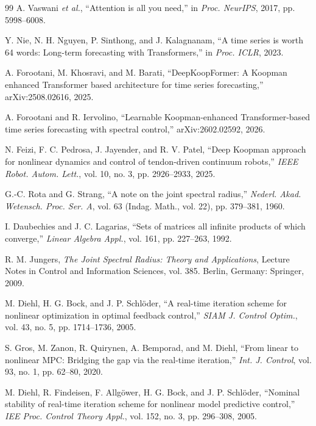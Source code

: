 \documentclass[journal]{IEEEtran}
\begin{document}
\begin{thebibliography}{99}
A. Vaswani \emph{et al.}, ``Attention is all you need,'' in \emph{Proc. NeurIPS}, 2017, pp. 5998--6008.

Y. Nie, N. H. Nguyen, P. Sinthong, and J. Kalagnanam, ``A time series is worth 64 words: Long-term forecasting with Transformers,'' in \emph{Proc. ICLR}, 2023.

A. Forootani, M. Khosravi, and M. Barati, ``DeepKoopFormer: A Koopman enhanced Transformer based architecture for time series forecasting,'' arXiv:2508.02616, 2025.

A. Forootani and R. Iervolino, ``Learnable Koopman-enhanced Transformer-based time series forecasting with spectral control,'' arXiv:2602.02592, 2026.

N. Feizi, F. C. Pedrosa, J. Jayender, and R. V. Patel, ``Deep Koopman approach for nonlinear dynamics and control of tendon-driven continuum robots,'' \emph{IEEE Robot. Autom. Lett.}, vol. 10, no. 3, pp. 2926--2933, 2025.

G.-C. Rota and G. Strang, ``A note on the joint spectral radius,'' \emph{Nederl. Akad. Wetensch. Proc. Ser. A}, vol. 63 (Indag. Math., vol. 22), pp. 379--381, 1960.

I. Daubechies and J. C. Lagarias, ``Sets of matrices all infinite products of which converge,'' \emph{Linear Algebra Appl.}, vol. 161, pp. 227--263, 1992.

R. M. Jungers, \emph{The Joint Spectral Radius: Theory and Applications}, Lecture Notes in Control and Information Sciences, vol. 385. Berlin, Germany: Springer, 2009.

M. Diehl, H. G. Bock, and J. P. Schl\"oder, ``A real-time iteration scheme for nonlinear optimization in optimal feedback control,'' \emph{SIAM J. Control Optim.}, vol. 43, no. 5, pp. 1714--1736, 2005.

S. Gros, M. Zanon, R. Quirynen, A. Bemporad, and M. Diehl, ``From linear to nonlinear MPC: Bridging the gap via the real-time iteration,'' \emph{Int. J. Control}, vol. 93, no. 1, pp. 62--80, 2020.

M. Diehl, R. Findeisen, F. Allg\"ower, H. G. Bock, and J. P. Schl\"oder, ``Nominal stability of real-time iteration scheme for nonlinear model predictive control,'' \emph{IEE Proc. Control Theory Appl.}, vol. 152, no. 3, pp. 296--308, 2005.


\end{thebibliography}
\end{document}
